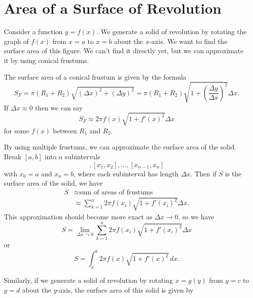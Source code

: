 \documentclass[10pt,]{book}
\numberwithin{equation}{section}
\newcommand{\amp}{&}
\begin{document}
\section[{Area of a Surface of Revolution}]{Area of a Surface of Revolution}\label{section-area-of-a-surface-of-revolution}
\hypertarget{p-661}{}%
Consider a function \(y=f(x)\). We generate a solid of revolution by rotating the graph of \(f(x)\) from \(x=a\) to \(x=b\) about the \(x\)-axis. We want to find the surface area of this figure. We can't find it directly yet, but we can approximate it by using conical frustums.%
\par
\hypertarget{p-662}{}%
The surface area of a conical frustum is given by the formula%
\begin{equation*}
S_{F}=\pi(R_{1}+R_{2})\sqrt{(\Delta x)^{2}+(\Delta y)^{2}}=\pi(R_{1}+R_{2})\sqrt{1+\left(\frac{\Delta y}{\Delta x}\right)^{2}}\Delta x.
\end{equation*}
If \(\Delta x\approx0\) then we can say%
\begin{equation*}
S_{F}\approx2\pi f(x)\sqrt{1+f'(x)^{2}}\Delta x
\end{equation*}
for some \(f(x)\) between \(R_{1}\) and \(R_{2}\).%
\par
\hypertarget{p-663}{}%
By using multiple frustums, we can approximate the surface area of the solid. Break \([a,b]\) into \(n\) subintervals%
\begin{equation*}
[x_{0},x_{1}],[x_{1},x_{2}],\ldots,[x_{n-1},x_{n}]
\end{equation*}
with \(x_{0}=a\) and \(x_{n}=b\), where each subinterval has length \(\Delta x\). Then if \(S\) is the surface area of the solid, we have%
\begin{align*}
S\amp\approx\text{sum of areas of frustums}\\
\amp\approx\sum_{k=1}^{n}2\pi f(x_{i})\sqrt{1+f'(x_{i})^{2}}\Delta x.
\end{align*}
This approximation should become more exact as \(\Delta x \to 0\), so we have%
\begin{equation*}
S=\lim_{\Delta x\to0}\sum_{k=1}^{n}2\pi f(x_{i})\sqrt{1+f'(x_{i})^{2}}\Delta x
\end{equation*}
or%
\begin{equation*}
S=\int_{a}^{b}2\pi f(x)\sqrt{1+f'(x)^{2}}\,dx.
\end{equation*}
%
\par
\hypertarget{p-664}{}%
Similarly, if we generate a solid of revolution by rotating \(x=g(y)\) from \(y=c\) to \(y=d\) about the \(y\)-axis, the surface area of this solid is given by%
\end{document}
